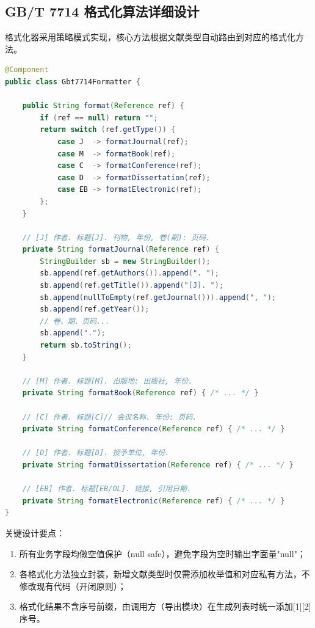 \subsection{GB/T 7714 格式化算法详细设计}

格式化器采用策略模式实现，核心方法根据文献类型自动路由到对应的格式化方法。

\begin{lstlisting}[language=Java,caption={Gbt7714Formatter 核心算法}]
@Component
public class Gbt7714Formatter {

    public String format(Reference ref) {
        if (ref == null) return "";
        return switch (ref.getType()) {
            case J  -> formatJournal(ref);
            case M  -> formatBook(ref);
            case C  -> formatConference(ref);
            case D  -> formatDissertation(ref);
            case EB -> formatElectronic(ref);
        };
    }

    // [J] 作者. 标题[J]. 刊物, 年份, 卷(期): 页码.
    private String formatJournal(Reference ref) {
        StringBuilder sb = new StringBuilder();
        sb.append(ref.getAuthors()).append(". ");
        sb.append(ref.getTitle()).append("[J]. ");
        sb.append(nullToEmpty(ref.getJournal())).append(", ");
        sb.append(ref.getYear());
        // 卷、期、页码...
        sb.append(".");
        return sb.toString();
    }

    // [M] 作者. 标题[M]. 出版地: 出版社, 年份.
    private String formatBook(Reference ref) { /* ... */ }

    // [C] 作者. 标题[C]// 会议名称. 年份: 页码.
    private String formatConference(Reference ref) { /* ... */ }

    // [D] 作者. 标题[D]. 授予单位, 年份.
    private String formatDissertation(Reference ref) { /* ... */ }

    // [EB] 作者. 标题[EB/OL]. 链接, 引用日期.
    private String formatElectronic(Reference ref) { /* ... */ }
}
\end{lstlisting}

关键设计要点：
\begin{enumerate}
    \item 所有业务字段均做空值保护（null safe），避免字段为空时输出字面量"null"；
    \item 各格式化方法独立封装，新增文献类型时仅需添加枚举值和对应私有方法，不修改现有代码（开闭原则）；
    \item 格式化结果不含序号前缀，由调用方（导出模块）在生成列表时统一添加[1][2]序号。
\end{enumerate}

